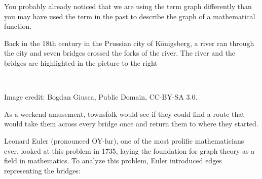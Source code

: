You probably already noticed that we are using the term graph differently than you may have used the term in the past to describe the graph of a mathematical function.

\begin{example}{}

Back in the 18th century in the Prussian city of K\"onigsberg, a river ran through the city and seven bridges crossed the forks of the river.  The river and the bridges are highlighted in the picture to the right
\begin{center}
\\\par{}\label{fig:Konigsberg_bridges}%

{\small Image credit: Bogdan Giusca, Public Domain, CC-BY-SA 3.0.}
\end{center}

As a weekend amusement, townsfolk would see if they could find a route that would take them across every bridge once and return them to where they started.

Leonard Euler (pronounced OY-lur), one of the most prolific mathematicians ever, looked at this problem in 1735, laying the foundation for graph theory as a field in mathematics.  To analyze this problem, Euler introduced edges representing the bridges:
\begin{center}
\par{}\label{fig:graphtheory-dor1-tikz03}%


\end{center}
\end{example}
